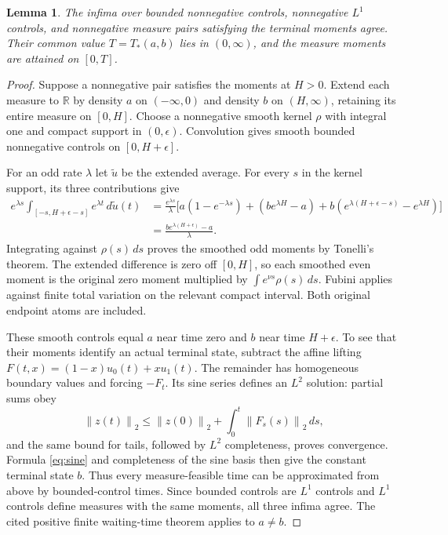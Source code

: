 \documentclass[11pt]{article}
\newtheorem{lemma}[theorem]{Lemma}
\theoremstyle{remark}
\newcommand{\R}{\mathbb R}
\newcommand{\norm}[1]{\left\lVert #1\right\rVert}
\begin{document}
\begin{lemma}\label{lem:attainment}
The infima over bounded nonnegative controls, nonnegative $L^1$ controls,
and nonnegative measure pairs satisfying the terminal moments agree.
Their common value $T=T_*(a,b)$ lies in $(0,\infty)$, and the measure
moments are attained on $[0,T]$.
\end{lemma}
\begin{proof}
Suppose a nonnegative pair satisfies the moments at $H>0$. Extend each
measure to $\R$ by density $a$ on $(-\infty,0)$ and density $b$ on
$(H,\infty)$, retaining its entire measure on $[0,H]$. Choose a nonnegative
smooth kernel $\rho$ with integral one and compact support in $(0,\epsilon)$.
Convolution gives smooth bounded nonnegative controls on $[0,H+\epsilon]$.

For an odd rate $\lambda$ let $\widetilde u$ be the extended average.
For every $s$ in the kernel support, its three contributions give
\begin{align*}
 e^{\lambda s}\int_{[-s,H+\epsilon-s]}e^{\lambda t}\,d\widetilde u(t)
 &=\frac{e^{\lambda s}}{\lambda}
 \bigl[a(1-e^{-\lambda s})+(be^{\lambda H}-a)
       +b(e^{\lambda(H+\epsilon-s)}-e^{\lambda H})\bigr]\\
 &=\frac{be^{\lambda(H+\epsilon)}-a}{\lambda}.
\end{align*}
Integrating against $\rho(s)\,ds$ proves the smoothed odd moments by
Tonelli's theorem. The extended difference is zero off $[0,H]$, so each
smoothed even moment is the original zero moment multiplied by
$\int e^{\nu s}\rho(s)\,ds$. Fubini applies against finite total variation
on the relevant compact interval. Both original endpoint atoms are included.

These smooth controls equal $a$ near time zero and $b$ near time
$H+\epsilon$. To see that their moments identify an actual terminal state,
subtract the affine lifting
$F(t,x)=(1-x)u_0(t)+xu_1(t)$. The remainder has homogeneous boundary values
and forcing $-F_t$. Its sine series defines an $L^2$ solution: partial sums
obey
\[
 \norm{z(t)}_2\le\norm{z(0)}_2+\int_0^t\norm{F_s(s)}_2\,ds,
\]
and the same bound for tails, followed by $L^2$ completeness, proves
convergence. Formula \eqref{eq:sine} and completeness of the sine basis
then give the constant terminal state $b$. Thus every measure-feasible time
can be approximated from above by bounded-control times. Since bounded
controls are $L^1$ controls and $L^1$ controls define measures with the same
moments, all three infima agree. The cited positive finite waiting-time
theorem applies to $a\ne b$.


\end{proof}
\end{document}
